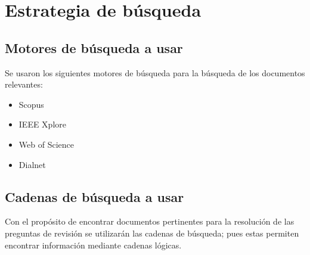 \section{Estrategia de búsqueda}

\subsection{Motores de búsqueda a usar}

Se usaron los siguientes motores de búsqueda para la búsqueda de los documentos relevantes:

\begin{itemize}
    \item Scopus
    \item IEEE Xplore
    \item Web of Science
    \item Dialnet %
\end{itemize}

\subsection{Cadenas de búsqueda a usar}

Con el propósito de encontrar documentos pertinentes para la resolución de las preguntas de revisión se utilizarán las cadenas de búsqueda; pues estas permiten encontrar información mediante cadenas lógicas.


